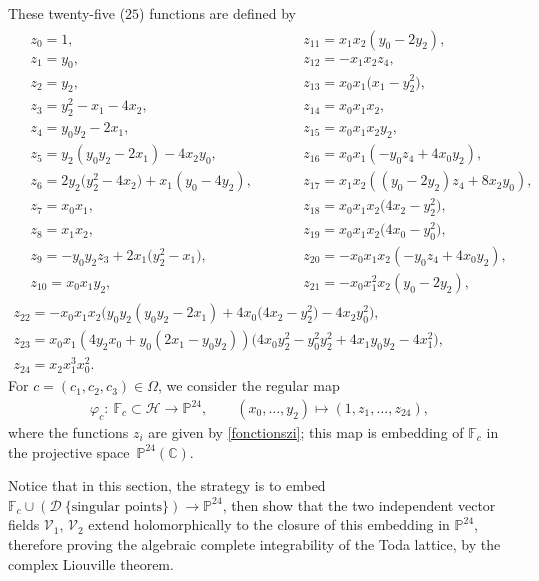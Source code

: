 \documentclass[10pt,a4paper]{amsart}
\numberwithin{equation}{section}
\begin{document}
 These twenty-five ($25$) functions are defined by
\begin{gather}
\begin{aligned}
 &z_0= 1,\qquad && z_{11}= x_1x_2 (y_0-2y_2 ),&\\
& z_1= y_0,\qquad && z_{12}= -x_1x_2z_4,&\\
& z_2= y_2,\qquad && z_{13}= x_0x_1 \bigl(x_1-y_2^2 \bigr),& \\
& z_3= y_2^2 -x_1-4x_2,\qquad && z_{14}= x_0x_1x_2,&\\
& z_4= y_0y_2-2x_1,\qquad && z_{15}= x_0x_1x_2y_2 ,&\\
 & z_5=y_2 (y_0y_2-2x_1 )-4x_2y_0,\qquad && z_{16}= x_0x_1 (-y_0z_4+4x_0y_2 ),&\\
 & z_6= 2y_2 \bigl(y_2^2-4x_2 \bigr)+x_1 (y_0-4y_2 ),\qquad && z_{17}= x_1x_2 ( (y_0-2y_2 )z_4+8x_2y_0 ),& \\
& z_7= x_0x_1,\qquad && z_{18}= x_0x_1x_2 \bigl(4x_2-y_2^2 \bigr),&\\
 &z_8= x_1x_2,\qquad && z_{19}=x_0x_1x_2 \bigl(4x_0-y_0^2 \bigr),&\\
& z_9= -y_0y_2z_3+2x_1 \bigl(y_2^2-x_1 \bigr),\qquad && z_{20}=-x_0x_1x_2 ( -y_0z_4+4x_0y_2 ),&\\
& z_{10}= x_0x_1y_2,\qquad && z_{21}=-x_0x_1^2x_2 (y_0-2y_2 ),&
 \end{aligned}\nonumber\\
 z_{22}= -x_0x_1x_2 \bigl(y_0y_2 (y_0y_2-2x_1 )+4x_0 \bigl(4x_2-y_2^2 \bigr)-4x_2y_0^2 \bigr),\nonumber\\
z_{23}= x_0x_1 (4y_2x_0+y_0 (2x_1-y_0y_2 ) ) \bigl(4x_0y_2^2-y_0^2y_2^2+4x_1y_0y_2-4x_1^2 \bigr),\nonumber\\
 z_{24}= x_2x_1^3x_0^2.\label{fonctionszi}
\end{gather}
 For $c=(c_1,c_2,c_3)\in \Omega$, we consider the regular map
\begin{align}
 \varphi_c\colon \ \mathbb{F}_c \subset\mathcal{H} \longrightarrow \mathbb{P}^{24},\qquad
 (x_0,\dots,y_2 ) \longmapsto (1,z_1,\dots,z_{24} ),\label{plongementP24}
\end{align}
 where the functions $z_i$ are given by \eqref{fonctionszi}; this map
 is embedding of $\mathbb{F}_c$ in the projective space~$\mathbb{P}^{24}(\mathbb{C})$.

Notice that in this section, the strategy is to embed $\mathbb{F}_c
\cup (\mathcal{D} \ \mbox{\{singular
points\}})\longrightarrow \mathbb{P}^{24}$, then show that the
two independent vector fields $\mathcal{V}_1$, $\mathcal{V}_2$ extend
holomorphically to the closure of this embedding in
$\mathbb{P}^{24}$, therefore proving the algebraic complete
integrability of the  Toda lattice, by the
complex Liouville theorem.
\end{document}
